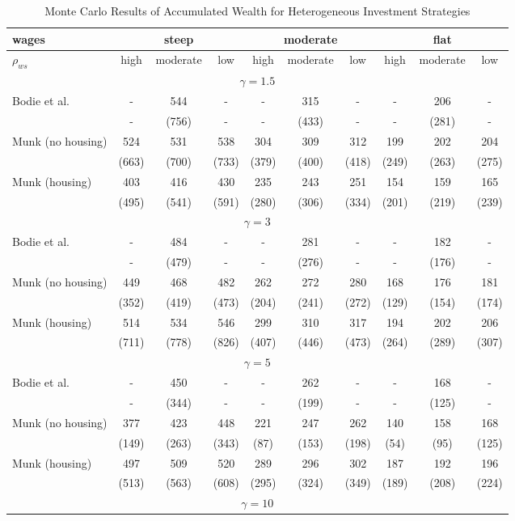 \documentclass[]{elsarticle}
\begin{document}
\begin{table}[h!]
	\centering
	\caption{Monte Carlo Results of Accumulated Wealth for Heterogeneous Investment Strategies}
	\label{table:wealthhet}
	\begin{tabular}[c]{|l|ccc|ccc|ccc|}
		\hline
		 wages& \multicolumn{3}{c|}{steep} & \multicolumn{3}{c|}{moderate} & \multicolumn{3}{c|}{flat}\\
		\hline
		$\rho_{ws}$&high&moderate&low&high&moderate&low&high&moderate&low\\
		\hline
	\multicolumn{10}{|c|}{$\gamma=1.5$}\\
		\hline
Bodie et al.			 	&-&  544  &-&-&   315&-&-&  206&-\\  
							&-&  (756)&-&-& (433)&-&-& (281)&-\\
Munk (no housing)			&  524  &  531&   538&  304&  309&  312&  199&  202&  204\\
							&  (663)&  (700)&  (733)&  (379)&  (400)&  (418)&  (249)&  (263)&  (275)\\
Munk (housing)				&  403  &  416&  430&  235&  243&  251&  154&  159&  165\\
							&  (495)&  (541)&  (591)&  (280)&  (306)&  (334)&  (201)&  (219)&  (239)\\
	\hline
	\multicolumn{10}{|c|}{$\gamma=3$}\\
	\hline
Bodie et al.			 	&-&  484  &-&-&281  &-&-& 182&-\\
							&-&  (479)&-&-&(276)&-&-& (176)&-\\
Munk (no housing)			&  449&  468&  482&  262&  272&  280&  168&  176&  181\\
							&  (352)&  (419)&  (473)&  (204)&  (241)&  (272)&  (129)&  (154)&  (174)\\
Munk (housing)				&  514&  534&  546&  299&  310&  317&  194&  202&  206\\
							&  (711)&  (778)&  (826)&  (407)&  (446)&  (473)&  (264)&  (289)&  (307)\\
	\hline
	\multicolumn{10}{|c|}{$\gamma=5$}\\

		\hline
Bodie et al.			 	&-& 450&-&-& 262&-&-& 168&-\\
							&-& (344)&-&-& (199)&-&-& (125)&-\\
Munk (no housing)			&  377&  423&  448&  221&  247&  262&  140&  158&  168\\
							&  (149)&  (263)&  (343)&  (87)&  (153)&  (198)&  (54)&  (95)&  (125)\\
Munk (housing)				&  497&  509&  520&  289&  296&  302&  187&  192&  196\\
							&  (513)&  (563)&  (608)&  (295)&  (324)&  (349)&  (189)&  (208)&  (224)\\
	\hline
	\multicolumn{10}{|c|}{$\gamma=10$}\\


\end{tabular}
\end{table}
\end{document}
